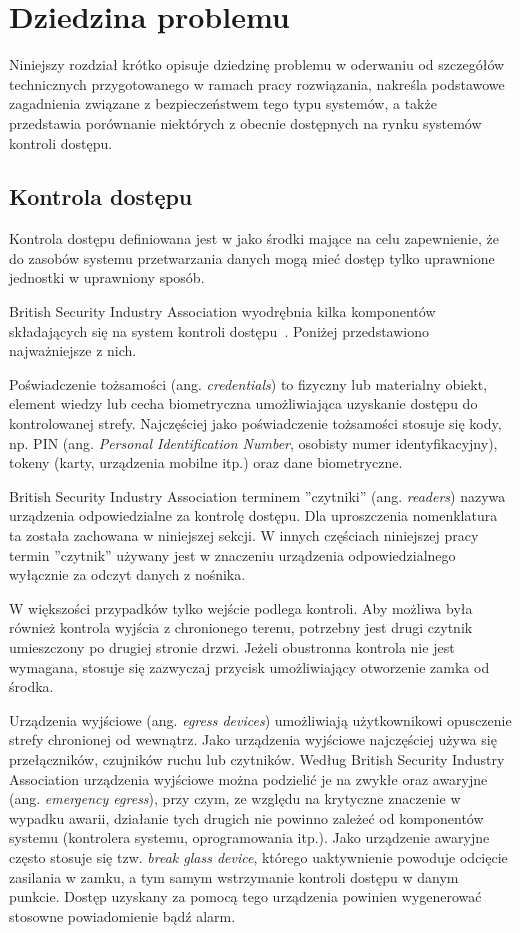 \chapter{Dziedzina problemu}
\label{chap:problem-domain}

	Niniejszy rozdział krótko opisuje dziedzinę problemu w oderwaniu od szczegółów technicznych przygotowanego w ramach pracy rozwiązania, nakreśla podstawowe zagadnienia związane z bezpieczeństwem tego typu systemów, a także przedstawia porównanie niektórych z obecnie dostępnych na rynku systemów kontroli dostępu.

	\section{Kontrola dostępu}

		Kontrola dostępu definiowana jest w \cite{pkn2002} jako środki mające na celu zapewnienie, że do zasobów systemu przetwarzania danych mogą mieć dostęp tylko uprawnione jednostki w uprawniony sposób.

		British Security Industry Association wyodrębnia kilka komponentów składających się na system kontroli dostępu~\cite{bsia2016}. Poniżej przedstawiono najważniejsze z nich.

		Poświadczenie tożsamości (ang. \textit{credentials}) to fizyczny lub materialny obiekt, element wiedzy lub cecha biometryczna umożliwiająca uzyskanie dostępu do kontrolowanej strefy. Najczęściej jako poświadczenie tożsamości stosuje się kody, np. PIN (ang. \textit{Personal Identification Number}, osobisty numer identyfikacyjny), tokeny (karty, urządzenia mobilne itp.) oraz dane biometryczne.

		British Security Industry Association terminem ''czytniki'' (ang. \textit{readers}) nazywa urządzenia odpowiedzialne za kontrolę dostępu. Dla uproszczenia nomenklatura ta została zachowana w niniejszej sekcji. W innych częściach niniejszej pracy termin ''czytnik'' używany jest w znaczeniu urządzenia odpowiedzialnego wyłącznie za odczyt danych z nośnika.

		W większości przypadków tylko wejście podlega kontroli. Aby możliwa była również kontrola wyjścia z chronionego terenu, potrzebny jest drugi czytnik umieszczony po drugiej stronie drzwi. Jeżeli obustronna kontrola nie jest wymagana, stosuje się zazwyczaj przycisk umożliwiający otworzenie zamka od środka.

		Urządzenia wyjściowe (ang. \textit{egress devices}) umożliwiają użytkownikowi opusczenie strefy chronionej od wewnątrz. Jako urządzenia wyjściowe najczęściej używa się przełączników, czujników ruchu lub czytników. Według British Security Industry Association urządzenia wyjściowe można podzielić je na zwykłe oraz awaryjne (ang. \textit{emergency egress}), przy czym, ze względu na krytyczne znaczenie w wypadku awarii, działanie tych drugich nie powinno zależeć od komponentów systemu (kontrolera systemu, oprogramowania itp.). Jako urządzenie awaryjne często stosuje się tzw. \textit{break glass device}, którego uaktywnienie powoduje odcięcie zasilania w zamku, a tym samym wstrzymanie kontroli dostępu w danym punkcie. Dostęp uzyskany za pomocą tego urządzenia powinien wygenerować stosowne powiadomienie bądź alarm.

